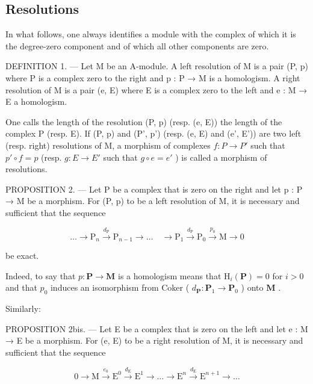 \subsection{Resolutions}

In what follows, one always identifies a module with the complex of which it is the degree-zero component and of which all other components are zero.

DEFINITION 1. --- Let M be an A-module. A left resolution of M is a pair (P, p) where P is a complex zero to the right and p : P → M is a homologism. A right resolution of M is a pair (e, E) where E is a complex zero to the left and e : M → E a homologism.

One calls the length of the resolution (P, p) (resp. (e, E)) the length of the complex P (resp. E). If (P, p) and (P', p') (resp. (e, E) and (e', E')) are two left (resp. right) resolutions of M, a morphism of complexes \(f: P \to P'\) such that \(p' \circ f = p\) (resp. \(g: E \to E'\) such that \(g \circ e = e'\) ) is called a morphism of resolutions.

PROPOSITION 2. --- Let P be a complex that is zero on the right and let p : P → M be a morphism. For (P, p) to be a left resolution of M, it is necessary and sufficient that the sequence

\[
\dots \longrightarrow \mathrm{P} _ {n} \xrightarrow {d _ {\mathrm{P}}} \mathrm{P} _ {n - 1} \longrightarrow \dots \quad \longrightarrow \mathrm{P} _ {1} \xrightarrow {d _ {\mathrm{P}}} \mathrm{P} _ {0} \xrightarrow {p _ {0}} \mathrm{M} \longrightarrow 0\tag{1}
\]

be exact.

Indeed, to say that \(p: \mathbf{P} \to \mathbf{M}\) is a homologism means that \(\mathrm{H}_{i}(\mathbf{P}) = 0\) for \(i > 0\) and that \(p_{0}\) induces an isomorphism from Coker ( \(d_{\mathbf{P}}: \mathbf{P}_{1} \to \mathbf{P}_{0}\) ) onto \(\mathbf{M}\) .

Similarly:

PROPOSITION 2bis. --- Let E be a complex that is zero on the left and let e : M → E be a morphism. For (e, E) to be a right resolution of M, it is necessary and sufficient that the sequence

\[
0 \longrightarrow \mathrm{M} \stackrel {e _ {0}} {\longrightarrow} \mathrm{E} ^ {0} \stackrel {d _ {\mathrm{E}}} {\longrightarrow} \mathrm{E} ^ {1} \longrightarrow \dots \longrightarrow \mathrm{E} ^ {n} \stackrel {d _ {\mathrm{E}}} {\longrightarrow} \mathrm{E} ^ {n + 1} \longrightarrow \dots\tag{1 bis}
\]

